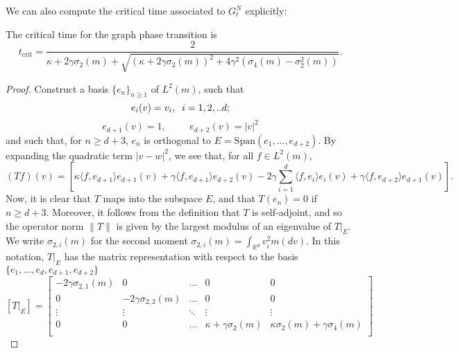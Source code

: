 We can also compute the critical time associated to $G^N_t$ explicitly:
\begin{lemma}\label{lemma: computation of tcrit} The critical time for the graph phase transition is \begin{equation}
       t_\text{crit}= \frac{2}{\kappa +2\gamma\sigma_2(m) + \sqrt{(\kappa+2\gamma\sigma_2(m))^2+4\gamma^2(\sigma_4(m)-\sigma_2^2(m))}}.
   \end{equation}\end{lemma} \begin{proof} Construct a basis $\{e_n\}_{n\geq 1}$ of $L^2(m)$, such that \begin{equation}
       e_i(v)=v_i, \hspace{0.2cm}i=1,2,..d;
   \end{equation}
   \begin{equation}
       e_{d+1}(v)=1, \hspace{1cm}e_{d+2}(v)=|v|^2
   \end{equation} and such that, for $n\geq d+3$, $e_n$ is orthogonal to $E=\text{Span}(e_1,...,e_{d+2})$.
   By expanding the quadratic term $|v-w|^2$, we see that, for all $f\in L^2(m),$ \begin{equation} 
       (Tf)(v)  =\left[\kappa\langle f, e_{d+1}\rangle e_{d+1}(v)
       +\gamma \langle f, e_{d+1}\rangle e_{d+2}(v)
       -2\gamma \sum_{i=1}^d \langle f, e_i\rangle e_i(v)
       +\gamma \langle f, e_{d+2}\rangle e_{d+1}(v)\right].
   \end{equation} 
  Now, it is clear that $T$ maps into the subspace $E$, and that $T(e_n)=0$ if $n\geq d+3.$ Moreover, it follows from the definition that $T$ is self-adjoint, and so the operator norm $\|T\|$ is given by the largest modulus of an eigenvalue of $T|_E.$ We write $\sigma_{2,i}(m)$ for the second moment $\sigma_{2,i}(m)=\int_{\mathbb{R}^d} v_i^2 m(dv)$. In this notation, $T|_E$ has the matrix representation with respect to the basis $\{e_1,...,e_d, e_{d+1}, e_{d+2}\}$ \begin{equation}
       \left[T|_E\right]=\begin{bmatrix}
    -2\gamma\sigma_{2,1}(m) & 0  & \dots  & 0 &0 \\
    0 & -2\gamma\sigma_{2,2}(m)  & \dots  & 0 &0\\
    \vdots & \vdots  & \ddots & \vdots &\vdots \\
    0 & 0  & \dots  & \kappa+\gamma\sigma_2(m) & \kappa\sigma_2(m)+\gamma \sigma_4(m) \\ 

\end{bmatrix}
\end{equation}
\end{proof}
